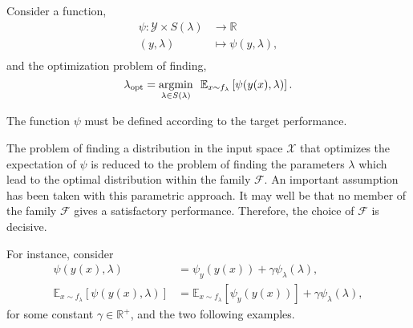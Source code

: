 Consider a function,
$$
  \begin{aligned}
    \psi : \mathcal{Y} \times S(\lambda) &\to \mathbb{R} \\
                          (y,\lambda)    &\mapsto \psi(y,\lambda),\\
  \end{aligned}
$$
and the optimization problem of finding,
\begin{equation} \label{eq_optimizationExpectation}
  \lambda_{\textup{opt}} = \underset{\lambda\in S(\lambda)}{\textup{argmin}} \ \ \mathbb{E}_{x \sim f_{\lambda}}\left[ \psi(y(x),\lambda) \right].
\end{equation}

\begin{remark}
The function $\psi$ must be defined according to the target performance.
\end{remark}

\begin{remark} \label{remark_parametricModel}
The problem of finding a distribution in the input space $\mathcal{X}$ that optimizes the expectation of $\psi$ is reduced to the problem of finding the parameters $\lambda$ which lead to the optimal distribution within the family $\mathcal{F}$.
An important assumption has been taken with this parametric approach.
It may well be that no member of the family $\mathcal{F}$ gives a satisfactory performance. Therefore, the choice of $\mathcal{F}$ is decisive.
\end{remark}

For instance, consider
$$
 \begin{aligned}
  \psi(y(x),\lambda) &= \psi_y(y(x)) + \gamma\psi_{\lambda}(\lambda), \\ 
  \mathbb{E}_{x \sim f_{\lambda}}\left[ \psi(y(x),\lambda) \right] &= 
  \mathbb{E}_{x \sim f_{\lambda}}\left[ \psi_y(y(x)) \right] +
  \gamma\psi_{\lambda}(\lambda), 
 \end{aligned}
$$
for some constant $\gamma \in \mathbb{R}^+$, and the two following examples.


